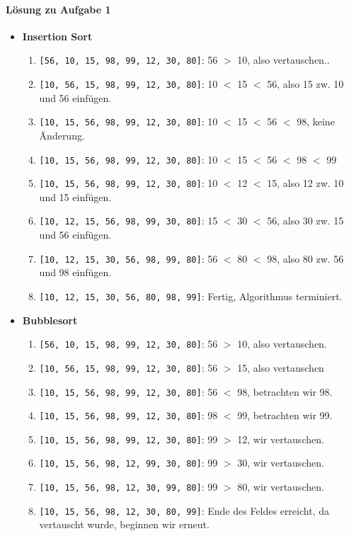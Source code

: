 \documentclass[11pt,a4paper]{scrartcl}
\begin{document}
\paragraph{Lösung zu Aufgabe 1}
\label{a3.1:lsg}
\begin{itemize}
\item \textbf{Insertion Sort}
\begin{enumerate}
\item \texttt{[56, 10, 15, 98, 99, 12, 30, 80]}: 56 $>$ 10, also vertauschen..
\item \texttt{[10, 56, 15, 98, 99, 12, 30, 80]}: 10 $<$ 15 $<$ 56, also 15 zw. 10 und 56 einfügen.
\item \texttt{[10, 15, 56, 98, 99, 12, 30, 80]}: 10 $<$ 15 $<$ 56 $<$ 98, keine Änderung.
\item \texttt{[10, 15, 56, 98, 99, 12, 30, 80]}: 10 $<$ 15 $<$ 56 $<$ 98 $<$ 99
\item \texttt{[10, 15, 56, 98, 99, 12, 30, 80]}: 10 $<$ 12 $<$ 15, also 12 zw. 10 und 15 einfügen.
\item \texttt{[10, 12, 15, 56, 98, 99, 30, 80]}: 15 $<$ 30 $<$ 56, also 30 zw. 15 und 56 einfügen.
\item \texttt{[10, 12, 15, 30, 56, 98, 99, 80]}: 56 $<$ 80 $<$ 98, also 80 zw. 56 und 98 einfügen.
\item \texttt{[10, 12, 15, 30, 56, 80, 98, 99]}: Fertig, Algorithmus terminiert.
\end{enumerate}
\item \textbf{Bubblesort}
\begin{enumerate}
\item \texttt{[56, 10, 15, 98, 99, 12, 30, 80]}: 56 $>$ 10, also vertauschen.
\item \texttt{[10, 56, 15, 98, 99, 12, 30, 80]}: 56 $>$ 15, also vertauschen
\item \texttt{[10, 15, 56, 98, 99, 12, 30, 80]}: 56 $<$ 98, betrachten wir 98.
\item \texttt{[10, 15, 56, 98, 99, 12, 30, 80]}: 98 $<$ 99, betrachten wir 99.
\item \texttt{[10, 15, 56, 98, 99, 12, 30, 80]}: 99 $>$ 12, wir vertauschen.
\item \texttt{[10, 15, 56, 98, 12, 99, 30, 80]}: 99 $>$ 30, wir vertauschen.
\item \texttt{[10, 15, 56, 98, 12, 30, 99, 80]}: 99 $>$ 80, wir vertauschen.
\item \texttt{[10, 15, 56, 98, 12, 30, 80, 99]}: Ende des Feldes erreicht, da vertauscht wurde, beginnen wir erneut.

\end{enumerate}
\end{itemize}
\end{document}
